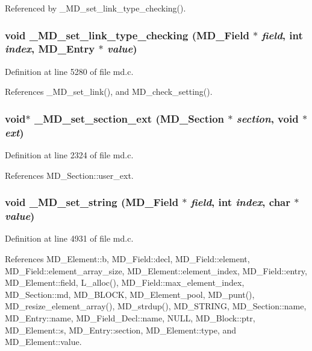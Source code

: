 Referenced by \_\-MD\_\-set\_\-link\_\-type\_\-checking().
\subsubsection{\setlength{\rightskip}{0pt plus 5cm}void \_\-MD\_\-set\_\-link\_\-type\_\-checking (\bf{MD\_\-Field} $\ast$ {\em field}, int {\em index}, \bf{MD\_\-Entry} $\ast$ {\em value})}\label{md_8c_70b4137a6c4c120aeaab956c4eba9788}




Definition at line 5280 of file md.c.

References \_\-MD\_\-set\_\-link(), and MD\_\-check\_\-setting().
\subsubsection{\setlength{\rightskip}{0pt plus 5cm}void$\ast$ \_\-MD\_\-set\_\-section\_\-ext (\bf{MD\_\-Section} $\ast$ {\em section}, void $\ast$ {\em ext})}\label{md_8c_c741671ef8a14e97c76a08ae4aaea7a6}




Definition at line 2324 of file md.c.

References MD\_\-Section::user\_\-ext.
\subsubsection{\setlength{\rightskip}{0pt plus 5cm}void \_\-MD\_\-set\_\-string (\bf{MD\_\-Field} $\ast$ {\em field}, int {\em index}, char $\ast$ {\em value})}\label{md_8c_58dfee0212f8877f158eefeddd2490fd}




Definition at line 4931 of file md.c.

References MD\_\-Element::b, MD\_\-Field::decl, MD\_\-Field::element, MD\_\-Field::element\_\-array\_\-size, MD\_\-Element::element\_\-index, MD\_\-Field::entry, MD\_\-Element::field, L\_\-alloc(), MD\_\-Field::max\_\-element\_\-index, MD\_\-Section::md, MD\_\-BLOCK, MD\_\-Element\_\-pool, MD\_\-punt(), MD\_\-resize\_\-element\_\-array(), MD\_\-strdup(), MD\_\-STRING, MD\_\-Section::name, MD\_\-Entry::name, MD\_\-Field\_\-Decl::name, NULL, MD\_\-Block::ptr, MD\_\-Element::s, MD\_\-Entry::section, MD\_\-Element::type, and MD\_\-Element::value.


